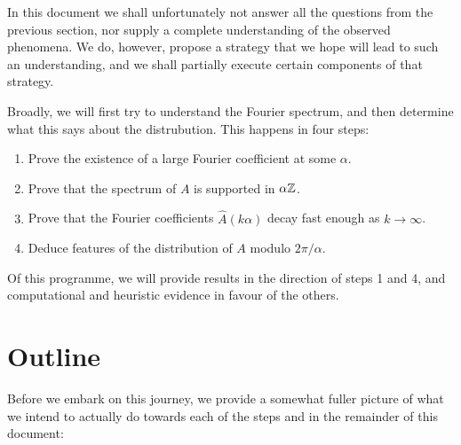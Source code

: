 \documentclass{report}
\theoremstyle{remark}
\numberwithin{equation}{section}
\begin{document}
In this document we shall unfortunately not answer all the questions
from the previous section, nor supply a complete understanding of the
observed phenomena.  We do, however, propose a strategy that we hope
will lead to such an understanding, and we shall partially execute
certain components of that strategy.

Broadly, we will first try to understand the Fourier spectrum, and
then determine what this says about the distrubution.  This happens in
four steps:

\begin{enumerate}
  \item Prove the existence of a large Fourier coefficient at
    some $\alpha$.
  \item Prove that the spectrum of $A$ is supported in $\alpha \mathbb{Z}$.  
  \item Prove that the Fourier coefficients $\widehat{A}(k\alpha)$
    decay fast enough as $k \to \infty$.  
  \item Deduce features of the distribution of $A$ modulo
    $2\pi/\alpha$.
\end{enumerate}

Of this programme, we will provide results in the direction of steps 1
and 4, and computational and heuristic evidence in favour of the
others.

\section{Outline}

Before we embark on this journey, we provide a somewhat fuller picture
of what we intend to actually do towards each of the steps and in the
remainder of this document:
\end{document}

